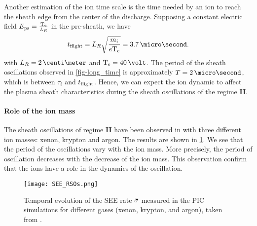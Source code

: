     Another estimation of the ion time scale is the time needed by an ion to reach the sheath edge from the center of the discharge.
    Supposing a constant electric field $E_{\rm ps} = \frac{\mathrm{T_e}}{L_R}$ in the pre-sheath, we have
    \begin{equation} \label{eq-tof}
      t_{\rm flight} = L_R \sqrt{\frac{m_i}{e \Te}} = 3.7 \,\micro\second.
    \end{equation}
    with $L_R=2\,\centi\meter$ and $\Te=40\,\volt$.
    The period of the sheath oscillations observed in \cref{fig-long_time} is approximately $T = 2\,\micro\second$, which is between $\tau_i$ and $t_{\rm flight}$.
    Hence, we can expect the ion dynamic to affect the plasma sheath characteristics during the sheath oscillations of the regime {\bf II}.
    
    \paragraph{Role of the ion mass \\}
    
    The sheath oscillations of regime {\bf II} have been observed in \citet{croes2017} with three different ion masses: xenon, krypton and argon.
    The results are shown in \cref{fig-RSO_altern}.
    We see that the period of the oscillations vary with the ion mass.
    More precisely, the period of oscillation decreases with the decrease of the ion mass.
    This observation confirm that the ions have a role in the dynamics of the oscillation.
    
    \begin{figure}[hbt]
      \centering
      \texttt{[image: SEE\_RSOs.png]}
      \caption{Temporal evolution of the SEE rate $ \bar{\sigma }$ measured in the PIC simulations for different gases (xenon, krypton, and argon), taken from \citet{croes2017}.}
      \label{fig-RSO_altern}
    \end{figure}
    
    